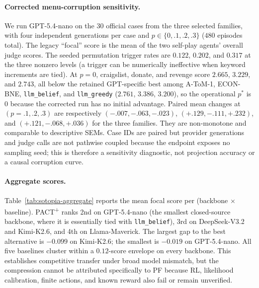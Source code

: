 \paragraph{Corrected menu-corruption sensitivity.} We run GPT-5.4-nano on the $30$ official cases from the three selected families, with four independent generations per case and $p\!\in\!\{0,.1,.2,.3\}$ ($480$ episodes total). The legacy ``focal'' score is the mean of the two self-play agents' overall judge scores. The seeded permutation trigger rates are $0.122$, $0.202$, and $0.317$ at the three nonzero levels (a trigger can be numerically ineffective when keyword increments are tied). At $p{=}0$, craigslist, donate, and revenge score $2.665$, $3.229$, and $2.743$, all below the retained GPT-specific best among A-ToM-1, ECON-BNE, \texttt{llm\_belief}, and \texttt{llm\_greedy} ($2.761$, $3.386$, $3.200$), so the operational $p^*$ is $0$ because the corrected run has no initial advantage. Paired mean changes at $(p{=}.1,.2,.3)$ are respectively $(-.007,-.063,-.023)$, $(+.129,-.111,+.232)$, and $(+.121,-.068,+.036)$ for the three families. They are non-monotone and comparable to descriptive SEMs. Case IDs are paired but provider generations and judge calls are not pathwise coupled because the endpoint exposes no sampling seed; this is therefore a sensitivity diagnostic, not projection accuracy or a causal corruption curve.

\paragraph{Aggregate scores.} Table~\ref{tab:sotopia-aggregate} reports the mean focal score per (backbone $\times$ baseline). PACT\textsuperscript{+} ranks 2nd on GPT-5.4-nano (the smallest closed-source backbone, where it is essentially tied with \texttt{llm\_belief}), 3rd on DeepSeek-V3.2 and Kimi-K2.6, and 4th on Llama-Maverick. The largest gap to the best alternative is $-0.099$ on Kimi-K2.6; the smallest is $-0.019$ on GPT-5.4-nano. All five baselines cluster within a $0.12$-score envelope on every backbone. This establishes competitive transfer under broad model mismatch, but the compression cannot be attributed specifically to PF because RL, likelihood calibration, finite actions, and known reward also fail or remain unverified.

